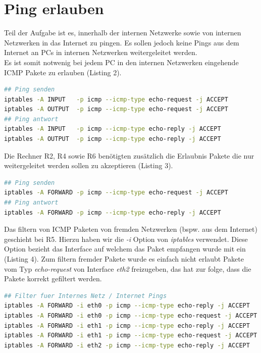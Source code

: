 \documentclass[a4paper,10pt]{article}
\begin{document}
\section{Ping erlauben}
Teil der Aufgabe ist es, innerhalb der internen Netzwerke sowie von internen Netzwerken in das Internet zu pingen. Es sollen
jedoch keine Pings aus dem Internet an PCs in internen Netzwerken weitergeleitet werden.\\
Es ist somit notwenig bei jedem PC in den internen Netzwerken eingehende ICMP Pakete zu erlauben (Listing 2).
\begin{lstlisting}[language=bash,caption={ICMP eingehend/ausgehend}]
## Ping senden
iptables -A INPUT   -p icmp --icmp-type echo-request -j ACCEPT
iptables -A OUTPUT  -p icmp --icmp-type echo-request -j ACCEPT
## Ping antwort
iptables -A INPUT   -p icmp --icmp-type echo-reply -j ACCEPT
iptables -A OUTPUT  -p icmp --icmp-type echo-reply -j ACCEPT
\end{lstlisting}
Die Rechner R2, R4 sowie R6 benötigten zusätzlich die Erlaubnis Pakete die nur weitergeleitet werden sollen zu akzeptieren (Listing 3).
\begin{lstlisting}[language=bash,caption={ICMP Weiterleitung}]
## Ping senden
iptables -A FORWARD -p icmp --icmp-type echo-request -j ACCEPT
## Ping antwort
iptables -A FORWARD -p icmp --icmp-type echo-reply -j ACCEPT
\end{lstlisting}
Das filtern von ICMP Paketen von fremden Netzwerken (bspw. aus dem Internet) geschieht bei R5. Hierzu haben wir die \textit{-i} Option
von \textit{iptables} verwendet. Diese Option bezieht das Interface auf welchem das Paket empfangen wurde mit ein (Listing 4). Zum
filtern fremder Pakete wurde es einfach nicht erlaubt Pakete vom Typ \textit{echo-request} von Interface \textit{eth2} freizugeben,
das hat zur folge, dass die Pakete korrekt gefiltert werden.
\begin{lstlisting}[language=bash,caption={ICMP filter}]
## Filter fuer Internes Netz / Internet Pings
iptables -A FORWARD -i eth0 -p icmp --icmp-type echo-reply -j ACCEPT
iptables -A FORWARD -i eth0 -p icmp --icmp-type echo-request -j ACCEPT
iptables -A FORWARD -i eth1 -p icmp --icmp-type echo-reply -j ACCEPT
iptables -A FORWARD -i eth1 -p icmp --icmp-type echo-request -j ACCEPT
iptables -A FORWARD -i eth2 -p icmp --icmp-type echo-reply -j ACCEPT
\end{lstlisting}

\newpage
\end{document}
